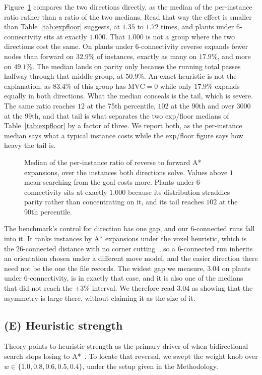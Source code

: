 \documentclass[letterpaper]{article} %
\begin{document}
Figure~\ref{fig:asym} compares the two directions directly, as the median of the per-instance ratio rather than a ratio of the two medians. Read that way the effect is smaller than Table~\ref{tab:expfloor} suggests, at $1.35$ to $1.72$ times, and plants under 6-connectivity sits at exactly $1.000$. That $1.000$ is not a group where the two directions cost the same. On plants under 6-connectivity reverse expands fewer nodes than forward on $32.9\%$ of instances, exactly as many on $17.9\%$, and more on $49.1\%$. The median lands on parity only because the running total passes halfway through that middle group, at $50.9\%$. An exact heuristic is not the explanation, as $83.4\%$ of this group has $\text{MVC}=0$ while only $17.9\%$ expands equally in both directions. What the median conceals is the tail, which is severe. The same ratio reaches $12$ at the 75th percentile, $102$ at the 90th and over $3000$ at the 99th, and that tail is what separates the two exp/floor medians of Table~\ref{tab:expfloor} by a factor of three. We report both, as the per-instance median says what a typical instance costs while the exp/floor figure says how heavy the tail is.

\begin{figure}[t] \centering
  
  \caption{Median of the per-instance ratio of reverse to forward A* expansions, over the instances both directions solve. Values above $1$ mean searching from the goal costs more. Plants under 6-connectivity sits at exactly $1.000$ because its distribution straddles parity rather than concentrating on it, and its tail reaches $102$ at the 90th percentile.}\label{fig:asym}
\end{figure}

The benchmark's control for direction has one gap, and our 6-connected runs fall into it. It ranks instances by A* expansions under the voxel heuristic, which is the 26-connected distance with no corner cutting~\cite{nobes2023voxel}, so a 6-connected run inherits an orientation chosen under a different move model, and the easier direction there need not be the one the file records. The widest gap we measure, $3.04$ on plants under 6-connectivity, is in exactly that case, and it is also one of the medians that did not reach the $\pm3\%$ interval. We therefore read $3.04$ as showing that the asymmetry is large there, without claiming it as the size of it.

\subsection{(E) Heuristic strength}
Theory points to heuristic strength as the primary driver of when bidirectional search stops losing to A*~\cite{alcazar2020unifying, siag2025bridging}. To locate that reversal, we swept the weight knob over $w \in \{1.0, 0.8, 0.6, 0.5, 0.4\}$, under the setup given in the Methodology.
\end{document}
